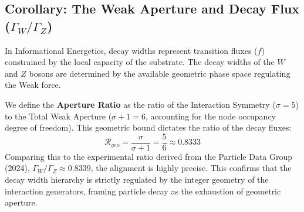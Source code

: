 \subsection{Corollary: The Weak Aperture and Decay Flux ($\Gamma_W / \Gamma_Z$)}

In Informational Energetics, decay widths represent transition fluxes ($f$) constrained by the local capacity of the substrate. The decay widths of the $W$ and $Z$ bosons are determined by the available geometric phase space regulating the Weak force. 

We define the \textbf{Aperture Ratio} as the ratio of the Interaction Symmetry ($\sigma=5$) to the Total Weak Aperture ($\sigma+1=6$, accounting for the node occupancy degree of freedom). This geometric bound dictates the ratio of the decay fluxes:
\begin{equation}
    \mathcal{R}_{geo} = \frac{\sigma}{\sigma+1} = \frac{5}{6} \approx 0.8333
\end{equation}
Comparing this to the experimental ratio derived from the Particle Data Group (2024), $\Gamma_W / \Gamma_Z \approx 0.8339$, the alignment is highly precise. This confirms that the decay width hierarchy is strictly regulated by the integer geometry of the interaction generators, framing particle decay as the exhaustion of geometric aperture.